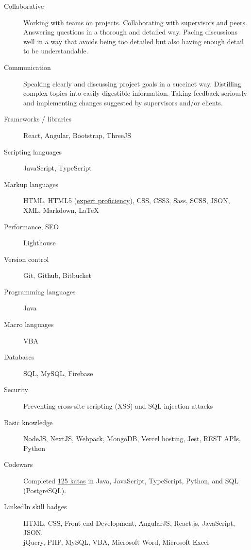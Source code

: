\documentclass{article}
\begin{document}
\begin{description}
  \item [Collaborative] Working with teams on projects. Collaborating with supervisors and peers. Answering questions in a thorough and detailed way. Pacing discussions well in a way that avoids being too detailed but also having enough detail to be understandable.
  \item [Communication] Speaking clearly and discussing project goals in a succinct way. Distilling complex topics into easily digestible information. Taking feedback seriously and implementing changes suggested by supervisors and/or clients.
  \item [Frameworks / libraries] React, Angular, Bootstrap, ThreeJS
  \item [Scripting languages] JavaScript, TypeScript
  \item [Markup languages] HTML, HTML5 (\href{https://app.pluralsight.com/profile/alexander-koik-cesto}{expert proficiency}), CSS, CSS3, Sass, SCSS, JSON, XML, Markdown, LaTeX
  \item [Performance, SEO] Lighthouse
  \item [Version control] Git, Github, Bitbucket
  \item [Programming languages] Java
  \item [Macro languages] VBA
  \item [Databases] SQL, MySQL, Firebase
  \item [Security] Preventing cross-site scripting (XSS) and SQL injection attacks
  \item [Basic knowledge] NodeJS, NextJS, Webpack, MongoDB, Vercel hosting, Jest, REST APIs, Python
  \item [Codewars] Completed \href{https://www.codewars.com/users/sirkoik}{125 katas} in Java, JavaScript, TypeScript, Python, and SQL (PostgreSQL).
  \item [LinkedIn skill badges] HTML, CSS, Front-end Development, AngularJS, React.js, JavaScript, JSON,\\ jQuery, PHP, MySQL, VBA, Microsoft Word, Microsoft Excel
\end{description}

\vspace{-1em}
\end{document}

